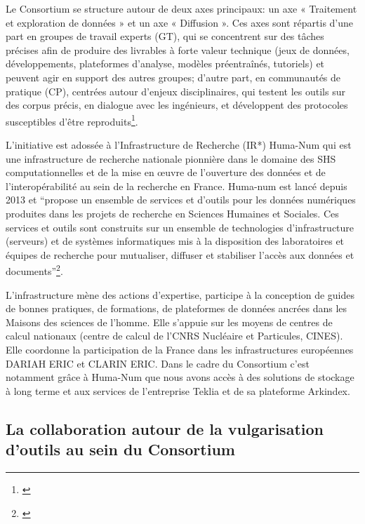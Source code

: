 Le Consortium se structure autour de deux axes principaux: un axe « Traitement et exploration de données » et un axe « Diffusion ». Ces axes sont répartis d’une part en groupes de travail experts (GT), qui se concentrent sur des tâches précises afin de produire des livrables à forte valeur technique (jeux de données, développements, plateformes d’analyse, modèles préentraînés, tutoriels) et peuvent agir en support des autres groupes; d’autre part, en communautés de pratique (CP), centrées autour d’enjeux disciplinaires, qui testent les outils sur des corpus précis, en dialogue avec les ingénieurs, et développent des protocoles susceptibles d’être reproduits\footnote{\cite{noauthor_groupes_nodate}}. \hfill \break

L'initiative est adossée à l'Infrastructure de Recherche (IR*) Huma-Num qui est une infrastructure de recherche nationale pionnière dans le domaine des SHS computationnelles et de la mise en œuvre de l'ouverture des données et de l'interopérabilité au sein de la recherche en France. Huma-num est lancé depuis 2013 et \enquote{propose un ensemble de services et d'outils pour les données numériques produites dans les projets de recherche en Sciences Humaines et Sociales. Ces services et outils sont construits sur un ensemble de technologies d’infrastructure (serveurs) et de systèmes informatiques mis à la disposition des laboratoires et équipes de recherche pour mutualiser, diffuser et stabiliser l’accès aux données et documents}\footnote{\cite{noauthor_presentation_nodate}}. 

L'infrastructure mène des actions d’expertise, participe à la conception de guides de bonnes pratiques, de formations, de plateformes de données ancrées dans les Maisons des sciences de l’homme. Elle s’appuie sur les moyens de centres de calcul nationaux (centre de calcul de l’CNRS Nucléaire et Particules, CINES). Elle coordonne la participation de la France dans les infrastructures européennes DARIAH ERIC et CLARIN ERIC. Dans le cadre du Consortium c'est notamment grâce à Huma-Num que nous avons accès à des solutions de stockage à long terme et aux services de l'entreprise Teklia et de sa plateforme Arkindex.

\subsection{La collaboration autour de la vulgarisation d'outils au sein du Consortium}

